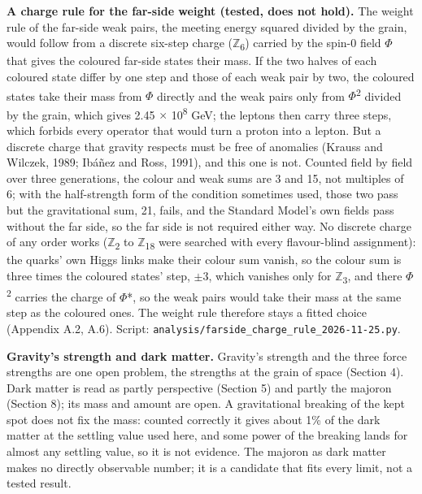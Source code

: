 \documentclass[
  11pt,
]{article}
\begin{document}
\textbf{A charge rule for the far-side weight (tested, does not hold).} The weight rule of the far-side weak pairs, the meeting energy squared divided by the grain, would follow from a discrete six-step charge (\ensuremath{\mathbb{Z}}\textsubscript{6}) carried by the spin-0 field \ensuremath{\Phi} that gives the coloured far-side states their mass. If the two halves of each coloured state differ by one step and those of each weak pair by two, the coloured states take their mass from \ensuremath{\Phi} directly and the weak pairs only from \ensuremath{\Phi}\textsuperscript{2} divided by the grain, which gives 2.45 \ensuremath{\times} 10\textsuperscript{8} GeV; the leptons then carry three steps, which forbids every operator that would turn a proton into a lepton. But a discrete charge that gravity respects must be free of anomalies (Krauss and Wilczek, 1989; Ibáñez and Ross, 1991), and this one is not. Counted field by field over three generations, the colour and weak sums are 3 and 15, not multiples of 6; with the half-strength form of the condition sometimes used, those two pass but the gravitational sum, 21, fails, and the Standard Model's own fields pass without the far side, so the far side is not required either way. No discrete charge of any order works (\ensuremath{\mathbb{Z}}\textsubscript{2} to \ensuremath{\mathbb{Z}}\textsubscript{18} were searched with every flavour-blind assignment): the quarks' own Higgs links make their colour sum vanish, so the colour sum is three times the coloured states' step, \ensuremath{\pm}3, which vanishes only for \ensuremath{\mathbb{Z}}\textsubscript{3}, and there \ensuremath{\Phi}\textsuperscript{2} carries the charge of \ensuremath{\Phi}*, so the weak pairs would take their mass at the same step as the coloured ones. The weight rule therefore stays a fitted choice (Appendix A.2, A.6). Script: \texttt{analysis/farside\_charge\_rule\_2026-11-25.py}.

\textbf{Gravity's strength and dark matter.} Gravity's strength and the three force strengths are one open problem, the strengths at the grain of space (Section 4). Dark matter is read as partly perspective (Section 5) and partly the majoron (Section 8); its mass and amount are open. A gravitational breaking of the kept spot does not fix the mass: counted correctly it gives about 1\% of the dark matter at the settling value used here, and some power of the breaking lands for almost any settling value, so it is not evidence. The majoron as dark matter makes no directly observable number; it is a candidate that fits every limit, not a tested result.
\end{document}
